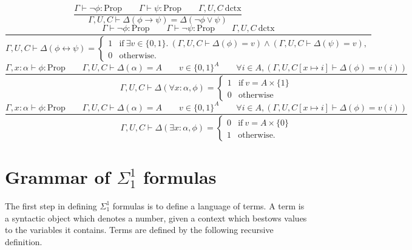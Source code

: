 \documentclass[11pt]{article}
\begin{document}
\begin{equation}
	\frac{
		\Gamma \vdash \neg\phi : \text{Prop}
		\qquad \Gamma \vdash \psi : \text{Prop}
		\qquad \Gamma,U,C\ \text{dctx}
	}{
		\Gamma,U,C \vdash \Delta(\phi \to \psi) = \Delta(\neg\phi \vee \psi)
	}
\end{equation}
\begin{equation}
	\frac{
		\Gamma \vdash \neg\phi : \text{Prop}
		\qquad \Gamma \vdash \neg\psi : \text{Prop}
		\qquad \Gamma,U,C\ \text{dctx}
	}{
		\Gamma,U,C \vdash \Delta(\phi \leftrightarrow \psi) = \begin{cases}
			1 & \text{if}\ \exists v \in \{0,1\}.\ (\Gamma,U,C \vdash \Delta(\phi) = v) \wedge (\Gamma,U,C \vdash \Delta(\psi) = v), \\
			0 & \text{otherwise}.
		\end{cases}
	}
\end{equation}
\begin{equation}
	\frac{
		\Gamma, x : \alpha \vdash \phi : \text{Prop}
		\qquad \Gamma,U,C \vdash \Delta(\alpha) = A
		\qquad v \in \{0,1\}^A
		\qquad \forall i \in A, (\Gamma,U,C[x \mapsto i] \vdash \Delta(\phi) = v(i))
	}{
		\Gamma,U,C \vdash \Delta(\forall x : \alpha, \phi) =
		\begin{cases}
			1 & \text{if}\ v = A \times \{1\} \\
			0 & \text{otherwise}
		\end{cases}
	}
\end{equation}
\begin{equation}
	\frac{
		\Gamma, x : \alpha \vdash \phi : \text{Prop}
		\qquad \Gamma,U,C \vdash \Delta(\alpha) = A
		\qquad v \in \{0,1\}^A
		\qquad \forall i \in A, (\Gamma,U,C[x \mapsto i] \vdash \Delta(\phi) = v(i))
	}{
		\Gamma,U,C \vdash \Delta(\exists x : \alpha, \phi) =
		\begin{cases}
			0 & \text{if}\ v = A \times \{0\} \\
			1 & \text{otherwise}.
		\end{cases}
	}
\end{equation}



\section{Grammar of $\Sigma^1_1$ formulas}
\label{sec:sigma11-grammar}

The first step in defining $\Sigma^1_1$ formulas is to define a language of
terms. A term is a syntactic object which denotes a number, given a context which
bestows values to the variables it contains. Terms are defined by the following
recursive definition.
\end{document}
